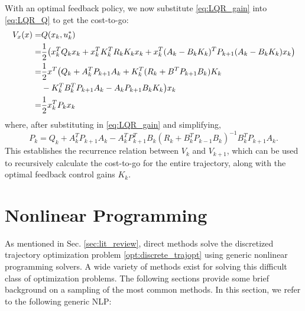 \documentclass[../root.tex]{subfiles}
\begin{document}
        With an optimal feedback policy, we now substitute
        \eqref{eq:LQR_gain} into \eqref{eq:LQR_Q} to get the cost-to-go:
        \begin{equation}
            \begin{aligned}
                V_x(x) =& Q(x_k,u_k^*) \\
                =& \frac{1}{2} \big(x_k^T Q_k x_k + x_k^T K_k^T R_k K_k x_k  
                +  x_k^T(A_k - B_k K_k)^T P_{k+1} (A_k - B_k K_k )x_k \big) \\
                =& \frac{1}{2} x^T \big( Q_k +  A_k^T P_{k+1} A_k  
                + K_k^T (R_k + B^T P_{k+1} B_k) K_k  \\
                &- K_k^T B_k^T P_{k+1} A_k - A_k P_{k+1} B_k K_k \big)x_k \\
                =& \frac{1}{2} x_k^T P_k x_k
            \end{aligned}
        \end{equation}
        where, after substituting in \eqref{eq:LQR_gain} and simplifying,
        \begin{equation}
            P_k = Q_k +  A_k^T P_{k+1} A_k  
                    - A_k^T P_{k+1}^T B_k (R_k + B_k^T P_{k-1} B_k)^{-1} B_k^T P_{k+1} A_k.
        \end{equation}
        This establishes the recurrence relation between $V_k$ and $V_{k+1}$,
        which can be used to recursively calculate the cost-to-go for the
        entire trajectory, along with the optimal feedback control gains
        $K_k$.


\section{Nonlinear Programming}
    As mentioned in Sec. \ref{sec:lit_review}, direct methods solve the
    discretized trajectory optimization problem \ref{opt:discrete_trajopt}
    using generic nonlinear programming solvers. A wide variety of methods
    exist for solving this difficult class of optimization problems. The
    following sections provide some brief background on a sampling of the
    most common methods. In this section, we refer to the following generic
    NLP:
\end{document}
